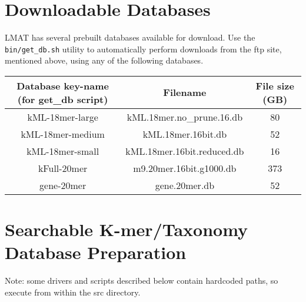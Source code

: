 \documentclass[11pt]{article}
\begin{document}
\section{Downloadable Databases}

LMAT has several prebuilt databases available for download.  Use the \texttt{bin/get\_db.sh} utility to automatically perform downloads from the ftp site, mentioned above, using any of the following databases.  

\begin{tabular}{| c | c | c |}
\hline
Database key-name (for get\_db script) & Filename & File size (GB) \\
\hline
kML-18mer-large & kML.18mer.no_prune.16.db & 80 \\
\hline
kML-18mer-medium & kML.18mer.16bit.db  & 52 \\
\hline
kML-18mer-small & kML.18mer.16bit.reduced.db  & 16 \\
\hline
kFull-20mer & m9.20mer.16bit.g1000.db & 373 \\
\hline
gene-20mer & gene.20mer.db & 52 \\
\hline
\end{tabular}






\section{Searchable K-mer/Taxonomy Database Preparation}


Note: some drivers and scripts described below contain hardcoded paths,
      so execute from within the src directory.
\end{document}
